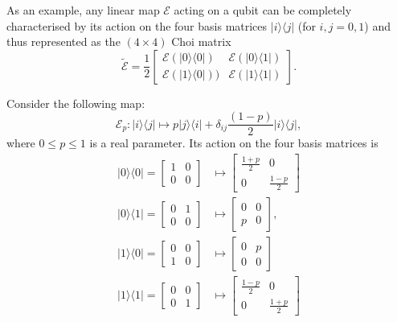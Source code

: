 \documentclass[fleqn]{article}
\begin{document}
As an example, any linear map \(\mathcal{E}\) acting on a qubit can be completely characterised by its action on the four basis matrices \(|i\rangle\langle j|\) (for \(i,j=0,1\)) and thus represented as the \((4\times 4)\) Choi matrix
\[
  \widetilde{\mathcal{E}}
  = \frac12
  \left[
    \begin{array}{c|c}
      \mathcal{E}(|0\rangle\langle 0|) & \mathcal{E}(|0\rangle\langle 1|)
    \\\hline
      \mathcal{E}(|1\rangle\langle 0|))  & \mathcal{E}(|1\rangle\langle 1|)
    \end{array}
  \right].
\]

Consider the following map:
\[
  \mathcal{E}_p\colon |i\rangle\langle j|
  \longmapsto p |j\rangle\langle i|+ \delta_{ij}\frac{(1-p)}{2}|i\rangle\langle j|,
\]
where \(0\leqslant p\leqslant 1\) is a real parameter.
Its action on the four basis matrices is
\[
  \begin{aligned}
    |0\rangle\langle 0| = \begin{bmatrix}1&0\\0&0\end{bmatrix}
    &\longmapsto \begin{bmatrix}\frac{1+p}{2}&0\\0&\frac{1-p}{2}\end{bmatrix}
  \\|0\rangle\langle 1| = \begin{bmatrix}0&1\\0&0\end{bmatrix}
    &\longmapsto \begin{bmatrix}0&0\\p&0\end{bmatrix},
  \\|1\rangle\langle 0| = \begin{bmatrix}0&0\\1&0\end{bmatrix}
    &\longmapsto \begin{bmatrix}0&p\\0&0\end{bmatrix}
  \\|1\rangle\langle 1| = \begin{bmatrix}0&0\\0&1\end{bmatrix}
    &\longmapsto \begin{bmatrix}\frac{1-p}{2}&0\\0&\frac{1+p}{2}\end{bmatrix}
  \end{aligned}
\]
\end{document}
